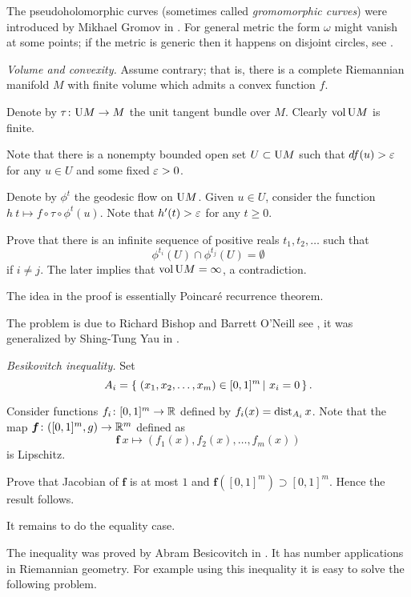  The pseudoholomorphic curves (sometimes called \emph{gromomorphic curves}) 
were introduced by Mikhael Gromov in \cite{gromov-pseudoholomorphic}.
For general metric the form $\omega$ might vanish at some points;
if the metric is generic then it happens on disjoint circles,
see \cite{honda}.







\textit{Volume and convexity.}
Assume contrary; that is, there is a complete Riemannian manifold $M$
with finite volume which admits a convex function $f$.

Denote by $\tau\colon\mathrm{U} M\to M$ the unit tangent bundle over $M$. 
Clearly $\operatorname{\rm vol} \mathrm{U} M$ is finite.

Note that 
there is a nonempty bounded open set $U\subset \mathrm{U} M$
such that $df(u)>\varepsilon$ for any $u\in U$ and some fixed $\varepsilon>0$.

Denote by $\phi^t$ the geodesic flow on $\mathrm{U} M$.
Given $u\in U$,
consider the function $h\:t\mapsto f\circ\tau\circ\phi^t(u)$.
Note that $h'(t)>\varepsilon$ for any $t\ge 0$.

Prove that there is an infinite sequence of positive reals $t_1,t_2,\dots$
such that 
$$\phi^{t_i}(U)\cap\phi^{t_j}(U)=\emptyset$$ 
if $i\ne j$.
The later implies that $\operatorname{\rm vol} \mathrm{U} M=\infty$,
a contradiction.

 The idea in the proof is essentially 
Poincar\'e recurrence theorem.

The problem is due 
to Richard Bishop and Barrett O'Neill see \cite{bishop-o'neill},
it was generalized by
Shing-Tung Yau  in \cite{yau}.


\textit{Besikovitch inequality.}
Set 
\[A_i=\set{(x_1,x_2,\dots,x_m)\in[0,1]^m}{x_i=0}.\]

Consider functions $f_i\colon[0,1]^m\to\mathbb{R}$ defined by
$f_i(x)=\operatorname{\rm dist}_{A_i}x$.
Note that 
the map $\bm{f}\colon([0,1]^m,g)\to\mathbb{R}^m$
defined as
\[\bm{f}\:x\mapsto(f_1(x),f_2(x),\dots,f_m(x))\]
is Lipschitz.

Prove that Jacobian of  $\bm{f}$
is at most $1$
and $\bm{f}([0,1]^m)\supset [0,1]^m$.
Hence the result follows.

It remains to do the equality case.

The inequality was proved by Abram Besicovitch in \cite{besicovitch}.
It has number applications in Riemannian geometry.
For example using this inequality it is easy to solve the following problem.

